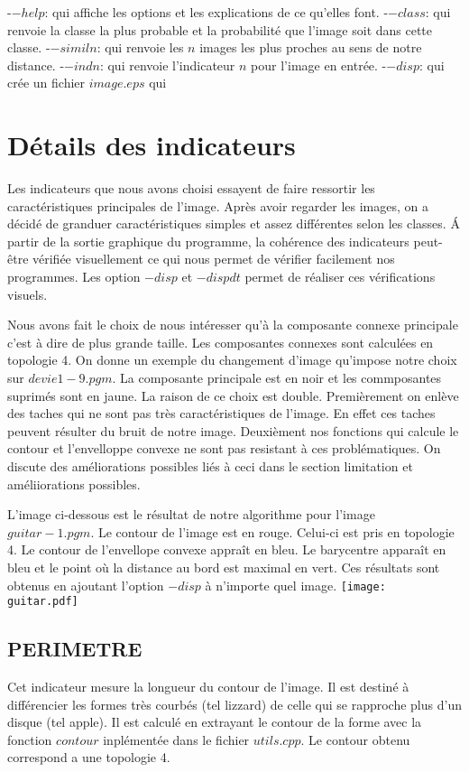 \documentclass{report}
\begin{document}
\noindent-$-help$: qui affiche les options et les explications de ce qu'elles font.
\noindent-$-class$: qui renvoie la classe la plus probable et la probabilité que l'image soit dans cette classe.
\noindent-$-simil n$: qui renvoie les $n$ images les plus proches au sens de notre distance.
\noindent-$-indn$: qui renvoie l'indicateur $n$ pour l'image en entrée.
\noindent-$-disp$: qui crée un fichier $image.eps$ qui 


\chapter{Détails des indicateurs}
Les indicateurs que nous avons choisi essayent de faire ressortir les caractéristiques principales de l'image.
Après avoir regarder les images, on a décidé de granduer caractéristiques simples et assez différentes selon les classes.
\'A partir de la sortie graphique du programme, la cohérence des indicateurs peut-être vérifiée visuellement ce 
qui nous permet de vérifier facilement nos programmes. Les option $-disp$ et $-dispdt$ permet de réaliser ces vérifications
visuels.

Nous avons fait le choix de nous intéresser qu'à la composante connexe principale c'est à dire de plus grande taille.
Les composantes connexes sont calculées en topologie 4.
On donne un exemple du changement d'image qu'impose notre choix sur $devie1-9.pgm$.
La composante principale est en noir et les commposantes suprimés sont en jaune.
La raison de ce choix est double.
Premièrement on enlève des taches qui ne sont pas très caractéristiques de l'image. 
En effet ces taches peuvent résulter du bruit de notre image.
Deuxièment nos fonctions qui calcule le contour et l'envelloppe convexe ne sont pas resistant à ces problématiques.
On discute des améliorations possibles liés à ceci dans le section limitation et améliiorations possibles.


L'image ci-dessous est le résultat de notre algorithme pour l'image $guitar-1.pgm$.
Le contour de l'image est en rouge. Celui-ci est pris en topologie 4. 
Le contour de l'envellope convexe appraît en bleu. Le barycentre apparaît en bleu et le point
où la distance au bord est maximal en vert.
Ces résultats sont obtenus en ajoutant l'option $-disp$ à n'importe quel image. 
\texttt{[image: guitar.pdf]}
\section{PERIMETRE} Cet indicateur mesure la longueur du contour de l'image. Il est destiné à différencier les formes très courbés (tel lizzard) de celle qui se rapproche plus d'un disque (tel apple). Il est calculé en extrayant le contour de la forme avec la fonction $contour$ inplémentée dans le fichier $utils.cpp$. Le contour obtenu correspond a une topologie 4.
\end{document}

